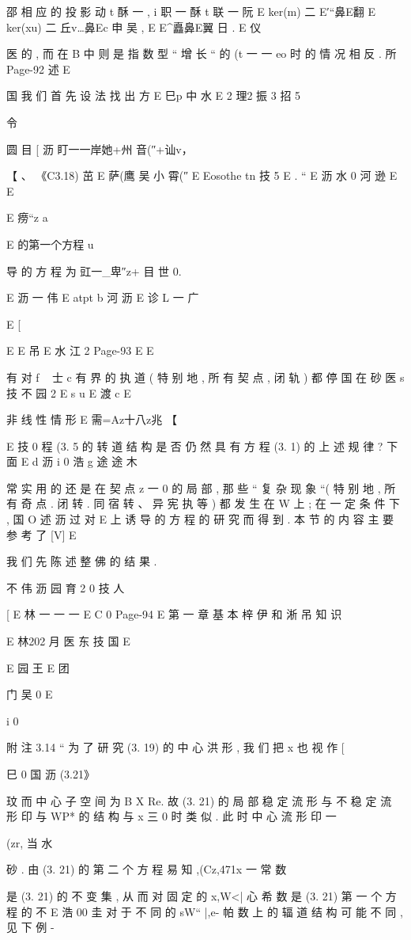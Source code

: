 {{邵 相 应 的 投 影
动 t 酥 一 , i 职 一 酥 t 联 一 阮
E
ker(m) 二 E′“鼻E翻 E
ker(xu) 二 丘v…鼻Ec 申 吴 ,
E E^矗鼻E翼 日 .
E 仪

医
的 , 而 在 B 中 则 是 指 数 型 “ 增 长 “ 的 (t 一 一 eo 时 的 情 况 相 反 . 所
Page-92
述 E

国 我 们 首 先 设 法 找 出 方
E 巳p 中 水
E 2 理2 振 3 招 5

令

圆 目
[ 沥
盯一一岸她+州 音(″+讪v，

【 、 《C3.18)
茁 E 萨(鹰 吴 小 霄(″ E
Eosothe tn 技 5
E .
“ E 沥 水 0 河 逊
E
E

E 痨“z a

E 的第一个方程 u

导 的 方 程 为
豇一_卑″z+ 目 世 0.

E 沥 一 伟
E atpt b 河 沥
E 诊 L 一 广

E [

E
E 吊 E 水 江 2
Page-93
E E

有 对 f ~ 士 c 有 界 的 执 道 ( 特 别 地 , 所 有 契 点 , 闭 轨 ) 都 停 国 在 砂
医 s 技 不 园 2
E s u
E 渡 c
E

非 线 性 情 形
E
需=Az十八z兆 【

E 技 0
程 (3. 5 的 转 道 结 构 是 否 仍 然 具 有 方 程 (3. 1) 的 上 述 规 律 ? 下 面
E d 沥 i
0 浩 g 途 途 木

常 实 用 的 还 是 在 契 点 z 一 0 的 局 部 , 那 些 “ 复 杂 现 象 “( 特 别 地 , 所
有 奇 点 . 闭 转 . 同 宿 转 、 异 宪 执 等 ) 都 发 生 在 W 上 ; 在 一 定 条 件 下 ,
国 O 述 沥
过 对 E 上 诱 导 的 方 程 的 研 究 而 得 到 . 本 节 的 内 容 主 要 参 考 了 [V]
E

我 们 先 陈 述 整 佛 的 结 果 .

不 伟 沥 园 育 2 0 技 人

[
E
林
一 一 一
E
C
0
Page-94
E 第 一 章 基 本 梓 伊 和 淅 吊 知 识

E 林202 月
医 东 技 国
E

E 园 王
E 团

门 吴 0
E

i
0

附 注 3.14 “ 为 了 研 究 (3. 19) 的 中 心 洪 形 , 我 们 把 x 也 视 作
[

巳 0 国
沥 (3.21》

玟
而 中 心 子 空 间 为 B X Re. 故 (3. 21) 的 局 部 稳 定 流 形 与 不 稳 定 流
形 印 与 WP* 的 结 构 与 x 三 0 时 类 似 . 此 时 中 心 流 形 印 一 {(zr, 当
水

砂 . 由 (3. 21) 的 第 二 个 方 程 易 知 ,(Cz,471x 一 常 数 } 是 (3. 21)
的 不 变 集 , 从 而 对 固 定 的 x,W<| 心 希 数 是 (3. 21) 第 一 个 方 程 的 不
E 浩 00 圭
对 于 不 同 的 sW“ |,e- 帕 数 上 的 辐 道 结 构 可 能 不 同 , 见 下 例 -

}}
